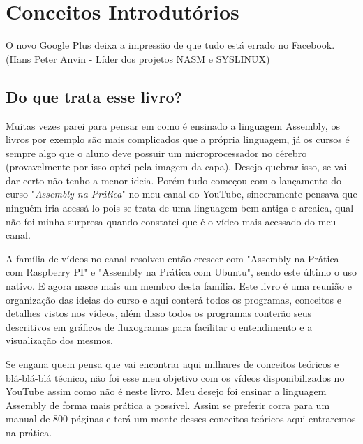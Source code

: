 \chapter{Conceitos Introdutórios}

\begin{remark}
O novo Google Plus deixa a impressão de que tudo está errado no Facebook. (Hans Peter Anvin - Líder dos projetos NASM e SYSLINUX) 
\end{remark}

\section{Do que trata esse livro?}

Muitas vezes parei para pensar em como é ensinado a linguagem Assembly, os livros por exemplo são mais complicados que a própria linguagem, já os cursos é sempre algo que o aluno deve possuir um microprocessador no cérebro (provavelmente por isso optei pela imagem da capa). Desejo quebrar isso, se vai dar certo não tenho a menor ideia. Porém tudo começou com o lançamento do curso "\textit{Assembly na Prática}" no meu canal do YouTube, sinceramente pensava que ninguém iria acessá-lo pois se trata de uma linguagem bem antiga e arcaica, qual não foi minha surpresa quando constatei que é o vídeo mais acessado do meu canal.

A família de vídeos no canal resolveu então crescer com "Assembly na Prática com Raspberry PI" e "Assembly na Prática com Ubuntu", sendo este último o uso nativo. E agora nasce mais um membro desta família. Este livro é uma reunião e organização das ideias do curso e aqui conterá todos os programas, conceitos e detalhes vistos nos vídeos, além disso todos os programas conterão seus descritivos em gráficos de fluxogramas para facilitar o entendimento e a visualização dos mesmos.

Se engana quem pensa que vai encontrar aqui milhares de conceitos teóricos e blá-blá-blá técnico, não foi esse meu objetivo com os vídeos disponibilizados no YouTube assim como não é neste livro. Meu desejo foi ensinar a linguagem Assembly de forma mais prática a possível. Assim se preferir corra para um manual de 800 páginas e terá um monte desses conceitos teóricos aqui entraremos na prática.

